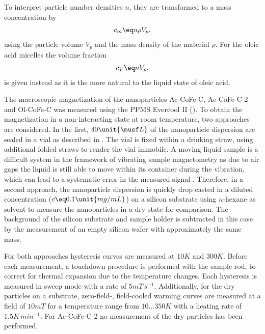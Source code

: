 \documentclass[\main/dresen_thesis.tex]{subfiles}
\begin{document}
    To interpret particle number densities $n$, they are transformed to a mass concentration by
    \begin{align}
      c_m \eq n \rho V_p,
    \end{align}
    using the particle volume $V_p$ and the mass density of the material $\rho$.
    For the oleic acid micelles the volume fraction
    \begin{align}
      c_V \eq n V_p,
    \end{align}
    is given instead as it is the more natural to the liquid state of oleic acid.

    The macroscopic magnetization of the nanoparticles Ac-CoFe-C, Ac-CoFe-C-2 and Ol-CoFe-C was measured using the PPMS Evercool II ().
    To obtain the magnetization in a non-interacting state at room temperature, two approaches are considered.
    In the first, $40 \unit{\musf L}$ of the nanoparticle dispersion are sealed in a vial as described in .
    The vial is fixed within a drinking straw, using additional folded straws to render the vial immobile.
    A moving liquid sample is a difficult system in the framework of vibrating sample magnetometry as due to air gaps the liquid is still able to move within its container during the vibration, which can lead to a systematic error in the measured signal \cite{Boekelheide_2016_Artif}.
    Therefore, in a second approach, the nanoparticle dispersion is quickly drop casted in a diluted concentration ($c \eq 0.1 \unit{mg/mL}$) on a silicon substrate using $\textit{n}$-hexane as solvent to measure the nanoparticles in a dry state for comparison.
    The background of the silicon substrate and sample holder is subtracted in this case by the measurement of an empty silicon wafer with approximately the same mass.

    For both approaches hysteresis curves are measured at $10 \unit{K}$ and $300 \unit{K}$.
    Before each measurement, a touchdown procedure is performed with the sample rod, to correct for thermal expansion due to the temperature changes.
    Each hysteresis is measured in sweep mode with a rate of $5 \unit{mT \, s^{-1}}$.
    Additionally, for the dry particles on a substrate, zero-field-, field-cooled warming curves are measured at a field of $10 \unit{mT}$ for a temperature range from $10 \ldots 350 \unit{K}$ with a heating rate of $1.5 \unit{K \, min^{-1}}$.
    For Ac-CoFe-C-2 no measurement of the dry particles has been performed.
\end{document}
